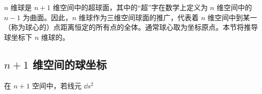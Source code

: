 
$n$ 维球是 $n+1$ 维空间中的超球面，其中的“超”字在数学上定义为 $n$ 维空间中的 $n-1$ 为曲面。因此，$n$ 维球作为三维空间球面的推广，代表着 $n$ 维空间中到某一（称为球心的）点距离恒定的所有点的全体。通常球心取为坐标原点。本节将推导球坐标下 $n$ 维球的。

\subsection{$n+1$ 维空间的球坐标}
在 $n+1$ 空间中，若线元 $\dd s^2$











